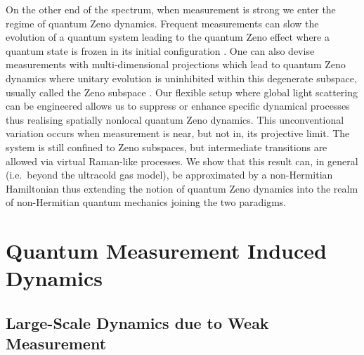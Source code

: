 On the other end of the spectrum, when measurement is strong we enter
the regime of quantum Zeno dynamics. Frequent measurements can slow
the evolution of a quantum system leading to the quantum Zeno effect
where a quantum state is frozen in its initial configuration
\cite{misra1977, facchi2008}. One can also devise measurements with
multi-dimensional projections which lead to quantum Zeno dynamics
where unitary evolution is uninhibited within this degenerate
subspace, usually called the Zeno subspace \cite{facchi2008,
  raimond2010, raimond2012, signoles2014}. Our flexible setup where global light
scattering can be engineered allows us to suppress or enhance specific
dynamical processes thus realising spatially nonlocal quantum Zeno
dynamics. This unconventional variation occurs when measurement is
near, but not in, its projective limit. The system is still confined
to Zeno subspaces, but intermediate transitions are allowed via
virtual Raman-like processes. We show that this result can, in general
(i.e.~beyond the ultracold gas model), be approximated by a
non-Hermitian Hamiltonian thus extending the notion of quantum Zeno
dynamics into the realm of non-Hermitian quantum mechanics joining the
two paradigms.

\section{Quantum Measurement Induced Dynamics}

\subsection{Large-Scale Dynamics due to Weak Measurement}

